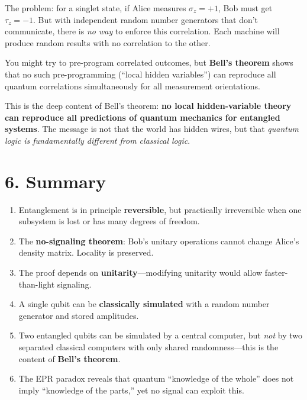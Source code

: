 \documentclass[12pt,a4paper]{article}
\begin{document}
The problem: for a singlet state, if Alice measures $\sigma_z=+1$, Bob must get $\tau_z=-1$.  But with independent random number generators that don't communicate, there is \emph{no way} to enforce this correlation.  Each machine will produce random results with no correlation to the other.

You might try to pre-program correlated outcomes, but \textbf{Bell's theorem} shows that no such pre-programming (``local hidden variables'') can reproduce all quantum correlations simultaneously for all measurement orientations.

This is the deep content of Bell's theorem: \textbf{no local hidden-variable theory can reproduce all predictions of quantum mechanics for entangled systems}.  The message is not that the world has hidden wires, but that \emph{quantum logic is fundamentally different from classical logic}.

\section{6. Summary}

\begin{enumerate}[nosep]
    \item Entanglement is in principle \textbf{reversible}, but practically irreversible when one subsystem is lost or has many degrees of freedom.
    \item The \textbf{no-signaling theorem}: Bob's unitary operations cannot change Alice's density matrix.  Locality is preserved.
    \item The proof depends on \textbf{unitarity}---modifying unitarity would allow faster-than-light signaling.
    \item A single qubit can be \textbf{classically simulated} with a random number generator and stored amplitudes.
    \item Two entangled qubits can be simulated by a central computer, but \emph{not} by two separated classical computers with only shared randomness---this is the content of \textbf{Bell's theorem}.
    \item The EPR paradox reveals that quantum ``knowledge of the whole'' does not imply ``knowledge of the parts,'' yet no signal can exploit this.
\end{enumerate}
\end{document}
